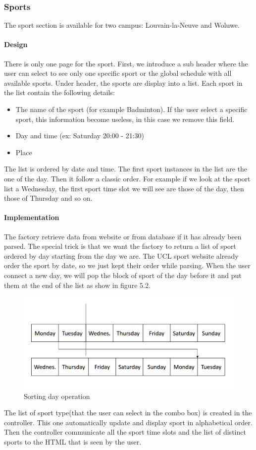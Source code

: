 \documentclass{eplmastersthesis}
\begin{document}
\subsubsection{Sports}
The sport section is available for two campus: Louvain-la-Neuve and Woluwe. 
\paragraph{Design}
There is only one page for the sport. First, we introduce a sub header where the user can select to see only one specific sport or the global schedule with all available sports. Under header, the sports are display into a list. Each sport in the list contain the following details:
\begin{itemize}
\item The name of the sport (for example Badminton). If the user select a specific sport, this information become useless, in this case we remove this field.
\item Day and time (ex: Saturday 20:00 - 21:30)
\item Place 
\end{itemize}
The list is ordered by date and time. The first sport instances in the list are the one of the day. Then it follow a classic order. For example if we look at the sport list a Wednesday, the first sport time slot we will see are those of the day, then those of Thursday and so on. 
\paragraph{Implementation}
The factory retrieve data from website or from database if it has already been parsed. The special trick is that we want the factory to return a list of sport ordered by day starting from the day we are. The UCL sport website already order the sport by date, so we just kept their order while parsing. When the user connect a new day, we will pop the block of sport of the day before it and put them at the end of the list as show in figure 5.2.
\begin{figure}
\centering
\includegraphics[scale = 0.3]{Images/sportsorting.png}
\caption{Sorting day operation}
\end{figure}
The list of sport type(that the user can select in the combo box) is created in the controller. This one automatically update and display sport in alphabetical order. Then the controller communicate all the sport time slots and the list of distinct sports to the HTML that is seen by the user. 
\end{document}
